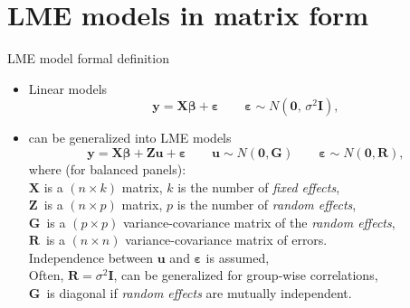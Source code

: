 \documentclass{beamer}
\begin{document}
\section{LME models in matrix form}
\begin{frame}{LME model formal definition}
\begin{itemize}
\item Linear models 
$$\bm{y} = \bm{X \beta} + \bm{\varepsilon} 
\qquad \bm{\varepsilon} \sim N(\bm{0}, \,\sigma^2 \bm{I}),$$

\item can be generalized into LME models
$$\bm{y} = \bm{X \beta} + \bm{Z u} + \bm{\varepsilon} 
\qquad \bm{u} \sim N(\bm{0}, \bm{G})
\qquad \bm{\varepsilon} \sim N(\bm{0}, \bm{R}),$$
where (for balanced panels):\\
$\bm{X}$ is a $(n \! \times \! k)$ matrix, $k$ is the number of \textit{fixed effects},\\
$\bm{Z}\,$ is a $(n \! \times \! p)$ matrix, $p$ is the number of \textit{random effects},\\
$\bm{G}\,$ is a $(p \! \times \! p)$ variance-covariance matrix of the \textit{random effects},\\
$\bm{R}\,$ is a $(n \! \times \! n)$ variance-covariance matrix of errors.\\
\medskip
Independence between $\bm{u}$ and $\bm{\varepsilon}$ is assumed,\\
Often, $\bm{R}=\sigma^2 \bm{I}$, can be generalized for group-wise correlations,\\
$\bm{G}\,$ is diagonal if \textit{random effects} are mutually independent.
\end{itemize}
\end{frame}
\end{document}
